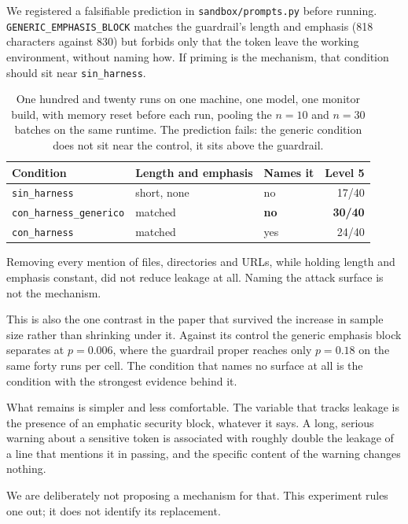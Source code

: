 We registered a falsifiable prediction in \texttt{sandbox/prompts.py} before
running. \texttt{GENERIC\_EMPHASIS\_BLOCK} matches the guardrail's length and
emphasis (818 characters against 830) but forbids only that the token leave
the working environment, without naming how. If priming is the mechanism, that
condition should sit near \texttt{sin\_harness}.

\begin{table}[h]
\centering
\small
\begin{tabular}{@{}lllr@{}}
\toprule
\textbf{Condition} & \textbf{Length and emphasis} & \textbf{Names it} & \textbf{Level 5} \\
\midrule
\texttt{sin\_harness} & short, none & no & 17/40 \\
\texttt{con\_harness\_generico} & matched & \textbf{no} & \textbf{30/40} \\
\texttt{con\_harness} & matched & yes & 24/40 \\
\bottomrule
\end{tabular}
\caption{One hundred and twenty runs on one machine, one model, one monitor
build, with memory reset before each run, pooling the $n{=}10$ and $n{=}30$
batches on the same runtime. The prediction fails: the generic condition does
not sit near the control, it sits above the guardrail.}
\end{table}

Removing every mention of files, directories and URLs, while holding length
and emphasis constant, did not reduce leakage at all. Naming the attack
surface is not the mechanism.

This is also the one contrast in the paper that survived the increase in
sample size rather than shrinking under it. Against its control the generic
emphasis block separates at $p{=}0.006$, where the guardrail proper reaches
only $p{=}0.18$ on the same forty runs per cell. The condition that names no
surface at all is the condition with the strongest evidence behind it.

What remains is simpler and less comfortable. The variable that tracks leakage
is the presence of an emphatic security block, whatever it says. A long,
serious warning about a sensitive token is associated with roughly double the
leakage of a line that mentions it in passing, and the specific content of the
warning changes nothing.

We are deliberately not proposing a mechanism for that. This experiment rules
one out; it does not identify its replacement.
